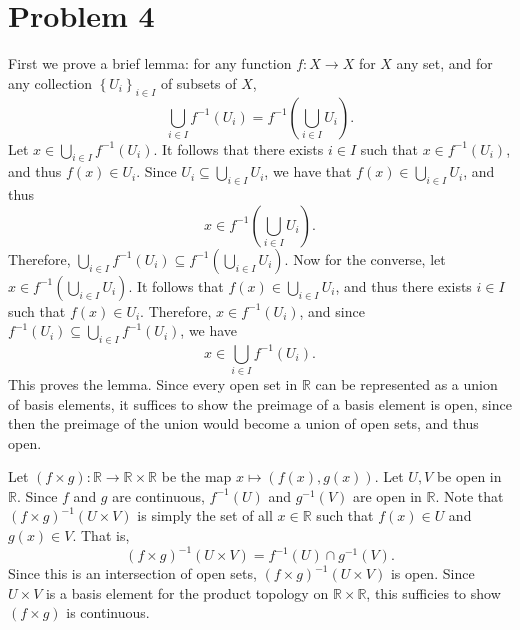 \documentclass[11pt, letterpaper]{article}
\begin{document}
\section*{Problem 4}
First we prove a brief lemma: for any function $f : X \to X$ for $X$ any set, and for any collection $\left\{ U_i \right\}_{i\in I} $ of subsets of $X$,
\[
	\bigcup_{i\in I} f^{-1} (U_i)=f^{-1} \left( \bigcup_{i\in I} U_i \right) 
.\]
Let $x\in \bigcup_{i\in I} f^{-1} (U_i)$. It follows that there exists $i\in I$ such that $x\in f^{-1} (U_i)$, and thus $f(x)\in U_i$. Since $U_i \subseteq \bigcup_{i\in I} U_i$, we have that $f(x)\in \bigcup_{i\in I} U_i$, and thus
\[
	x\in f^{-1} \left( \bigcup_{i\in I} U_i \right) 
.\]
Therefore, $\bigcup_{i\in I} f^{-1} (U_i)\subseteq f^{-1} \left( \bigcup_{i\in I} U_i \right) $. Now for the converse, let $x\in f^{-1} \left( \bigcup_{i\in I} U_i \right) $. It follows that $f(x)\in \bigcup_{i\in I} U_i$, and thus there exists $i\in I$ such that $f(x)\in U_i$. Therefore, $x\in f^{-1} (U_i)$, and since $f^{-1} (U_i)\subseteq \bigcup_{i\in I} f^{-1} (U_i)$, we have
\[
	x\in \bigcup_{i\in I} f^{-1} (U_i)
.\]
This proves the lemma. Since every open set in $\mathbb{R} $ can be represented as a union of basis elements, it suffices to show the preimage of a basis element is open, since then the preimage of the union would become a union of open sets, and thus open.

Let $(f\times g) : \mathbb{R}  \to \mathbb{R} \times \mathbb{R} $ be the map $x\mapsto (f(x),g(x))$. Let $U,V$ be open in $\mathbb{R} $. Since $f$ and $g$ are continuous, $f^{-1} (U)$ and $g^{-1} (V)$ are open in $\mathbb{R} $. Note that $(f\times g)^{-1} (U\times V)$ is simply the set of all $x\in\mathbb{R} $ such that $f(x)\in U$ and $g(x)\in V$. That is,
\[
	(f\times g)^{-1} (U\times V)=f^{-1} (U)\cap g^{-1} (V)
.\]
Since this is an intersection of open sets, $(f\times g)^{-1} (U\times V)$ is open. Since $U\times V$ is a basis element for the product topology on $\mathbb{R} \times \mathbb{R} $, this sufficies to show $(f\times g)$ is continuous.
\end{document}

